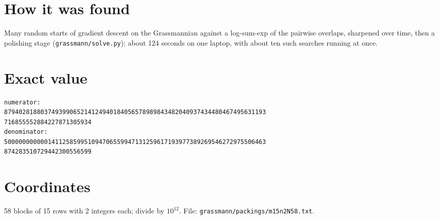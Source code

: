 \documentclass[11pt,a4paper]{article}
\begin{document}
\section{How it was found}
Many random starts of gradient descent on the Grassmannian against a log-sum-exp of the pairwise overlaps, sharpened over time, then a polishing stage (\texttt{grassmann/solve.py}); about 124 seconds on one laptop, with about ten such searches running at once.


\appendix
\section{Exact value}
{\small
\begin{verbatim}
numerator:
879402818803749399065214124940184056578989843482040937434480467495631193
716855552884227871305934
denominator:
500000000000141125859951094706559947131259617193977389269546272975506463
874283510729442300556599
\end{verbatim}}

\section{Coordinates}
58 blocks of 15 rows with 2 integers each; divide by $10^{12}$. File: \texttt{grassmann/packings/m15n2N58.txt}.
{\tiny
\begin{multicols}{4}
\end{multicols}}
\end{document}

